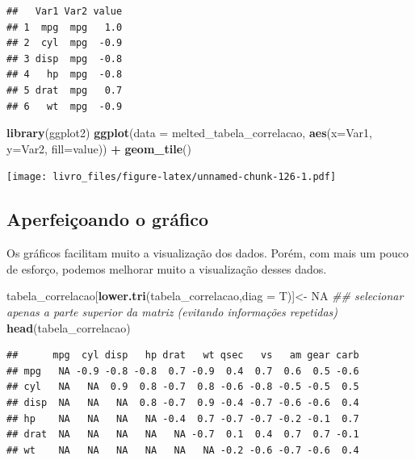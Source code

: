 \documentclass[
]{book}
\newenvironment{Shaded}{\begin{snugshade}}{\end{snugshade}}
\newcommand{\CommentTok}[1]{\textcolor[rgb]{0.56,0.35,0.01}{\textit{#1}}}
\newcommand{\DataTypeTok}[1]{\textcolor[rgb]{0.13,0.29,0.53}{#1}}
\newcommand{\KeywordTok}[1]{\textcolor[rgb]{0.13,0.29,0.53}{\textbf{#1}}}
\newcommand{\NormalTok}[1]{#1}
\newcommand{\OperatorTok}[1]{\textcolor[rgb]{0.81,0.36,0.00}{\textbf{#1}}}
\newcommand{\OtherTok}[1]{\textcolor[rgb]{0.56,0.35,0.01}{#1}}
\newcommand{\StringTok}[1]{\textcolor[rgb]{0.31,0.60,0.02}{#1}}
\begin{document}
\begin{verbatim}
##   Var1 Var2 value
## 1  mpg  mpg   1.0
## 2  cyl  mpg  -0.9
## 3 disp  mpg  -0.8
## 4   hp  mpg  -0.8
## 5 drat  mpg   0.7
## 6   wt  mpg  -0.9
\end{verbatim}

\begin{Shaded}
\begin{Highlighting}[]
\KeywordTok{library}\NormalTok{(ggplot2)}
\KeywordTok{ggplot}\NormalTok{(}\DataTypeTok{data =}\NormalTok{ melted_tabela_correlacao, }\KeywordTok{aes}\NormalTok{(}\DataTypeTok{x=}\NormalTok{Var1, }\DataTypeTok{y=}\NormalTok{Var2, }\DataTypeTok{fill=}\NormalTok{value)) }\OperatorTok{+}\StringTok{ }
\StringTok{  }\KeywordTok{geom_tile}\NormalTok{()}
\end{Highlighting}
\end{Shaded}

\texttt{[image: livro\_files/figure-latex/unnamed-chunk-126-1.pdf]}

\hypertarget{aperfeiuxe7oando-o-gruxe1fico}{%
\subsection{Aperfeiçoando o
gráfico}\label{aperfeiuxe7oando-o-gruxe1fico}}

Os gráficos facilitam muito a visualização dos dados. Porém, com mais um
pouco de esforço, podemos melhorar muito a visualização desses dados.

\begin{Shaded}
\begin{Highlighting}[]
\NormalTok{tabela_correlacao[}\KeywordTok{lower.tri}\NormalTok{(tabela_correlacao,}\DataTypeTok{diag =}\NormalTok{ T)]<-}\StringTok{ }\OtherTok{NA} \CommentTok{## selecionar apenas a parte superior da matriz (evitando informações repetidas)}
\KeywordTok{head}\NormalTok{(tabela_correlacao)}
\end{Highlighting}
\end{Shaded}

\begin{verbatim}
##      mpg  cyl disp   hp drat   wt qsec   vs   am gear carb
## mpg   NA -0.9 -0.8 -0.8  0.7 -0.9  0.4  0.7  0.6  0.5 -0.6
## cyl   NA   NA  0.9  0.8 -0.7  0.8 -0.6 -0.8 -0.5 -0.5  0.5
## disp  NA   NA   NA  0.8 -0.7  0.9 -0.4 -0.7 -0.6 -0.6  0.4
## hp    NA   NA   NA   NA -0.4  0.7 -0.7 -0.7 -0.2 -0.1  0.7
## drat  NA   NA   NA   NA   NA -0.7  0.1  0.4  0.7  0.7 -0.1
## wt    NA   NA   NA   NA   NA   NA -0.2 -0.6 -0.7 -0.6  0.4
\end{verbatim}
\end{document}
